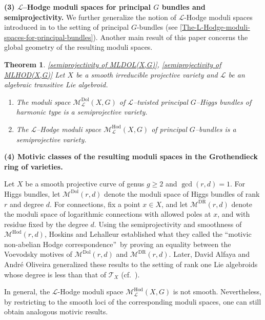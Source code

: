 \documentclass[12pt,reqno]{amsart}
\numberwithin{equation}{subsection}
\newtheorem{thm}[equation]{Theorem}
\theoremstyle{definition}
\theoremstyle{theorem}
\begin{document}
\medskip

\noindent
\textbf{(3) $\mathcal{L}$--Hodge moduli spaces for principal $G$ bundles and semiprojectivity.}
We further generalize the notion of \(\mathcal{L}\)-Hodge moduli spaces introduced in \cite{Alfaya-Oliveire-2024} to the setting of principal \(G\)-bundles (see \eqref{The-L-Hodge-moduli-spaces-for-principal-bundles}). Another main result of this paper concerns the global geometry of the resulting moduli spaces.

\begin{thm} \eqref{semiprojectivity of MLDOL(X,G)}, \eqref{semiprojectivity of MLHOD(X,G)}
Let $X$ be a smooth irreducible projective variety and $\mathcal{L}$ be an algebraic transitive Lie algebroid.
	\begin{enumerate}
		\item The moduli space $\mathcal{M}^{\mathrm{Dol}}_{\mathcal{L}}(X,G)$ of $\mathcal{L}$--twisted principal $G$--Higgs bundles of harmonic type is a semiprojective variety.
		\item The $\mathcal{L}$--Hodge moduli space $\mathcal{M}^{\mathrm{Hod}}_{\mathcal{L}}(X,G)$ of principal $G$--bundles is a semiprojective variety.
	\end{enumerate}
\end{thm}


\noindent
\textbf{(4) Motivic classes of the resulting moduli spaces in the Grothendieck ring of varieties.}

Let \(X\) be a smooth projective curve of genus \(g \geqslant 2\) and $\gcd(r,d) = 1$. For Higgs bundles, let \(\mathcal{M}^{\mathrm{Dol}}(r,d)\) denote the moduli space of Higgs bundles of rank \(r\) and degree \(d\). For connections, fix a point \(x \in X\), and let \(\mathcal{M}^{\mathrm{DR}}(r,d)\) denote the moduli space of logarithmic connections with allowed poles at \(x\), and with residue fixed by the degree \(d\). Using the semiprojectivity and smoothness of \(\mathcal{M}^{\mathrm{Hod}}(r,d)\), Hoskins and Lehalleur \cite{Hoskins-Lehalleur-2021} established what they called the \textquotedblleft motivic non-abelian Hodge correspondence\textquotedblright\ by proving an equality between the Voevodsky motives of \(\mathcal{M}^{\mathrm{Dol}}(r,d)\) and \(\mathcal{M}^{\mathrm{DR}}(r,d)\). Later, David Alfaya and Andr\'e Oliveira generalized these results to the setting of rank one Lie algebroids whose degree is less than that of \(\mathcal{T}_{X}\) (cf.~\cite{Alfaya-Oliveire-2024}).

In general, the \(\mathcal{L}\)-Hodge moduli space \(\mathcal{M}^{\mathrm{Hod}}_{\mathcal{L}}(X,G)\) is not smooth. Nevertheless, by restricting to the smooth loci of the corresponding moduli spaces, one can still obtain analogous motivic results.
\end{document}
